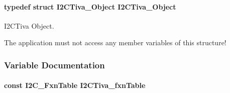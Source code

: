 \paragraph[{I2\-C\-Tiva\-\_\-\-Object}]{\setlength{\rightskip}{0pt plus 5cm}typedef struct {\bf I2\-C\-Tiva\-\_\-\-Object}  {\bf I2\-C\-Tiva\-\_\-\-Object}}\label{_i2_c_tiva_8h_a56bbf0bf756fabe1c1c6b905a1b88ee7}


I2\-C\-Tiva Object. 

The application must not access any member variables of this structure! 

\subsubsection{Variable Documentation}
\paragraph[{I2\-C\-Tiva\-\_\-fxn\-Table}]{\setlength{\rightskip}{0pt plus 5cm}const {\bf I2\-C\-\_\-\-Fxn\-Table} I2\-C\-Tiva\-\_\-fxn\-Table}\label{_i2_c_tiva_8h_aa37c457a45a8fa5451616bdb9cb5ce49}
